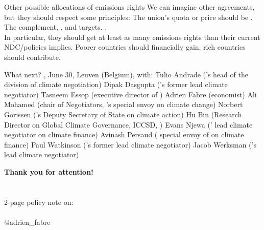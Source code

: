 \documentclass[aspectratio=169,xcolor=dvipsnames, 11pt,mathserif]{beamer}
\begin{document}
\begin{framefont}{\small}
\begin{frame}{Other possible allocations of emissions rights}
    \bbsp \ip We can imagine other agreements, but they should respect some principles:
    \ip The union's quota or price should be . 
    \ip The  complement, ,  and targets.
    \ip {}. \\ In particular, they should get at least as many emissions rights than their current NDC/policies implies.
    \ip Poorer countries should financially gain, rich countries should contribute.
    \ee
\end{frame}

\begin{frame}{What next?}
    \bbvs \ip {}, June 30, Leuven (Belgium), with:
    \bbvs \ip Tulio Andrade ('s head of the division of climate negotiation)
    \ip Dipak Dasgupta ('s former lead climate negotiator)
    \ip Tasneem Essop (executive director of )
    \ip Adrien Fabre (economist)
    \ip Ali Mohamed (chair of  Negotiators, 's special envoy on climate change)
    \ip Norbert Gorissen ('s Deputy Secretary of State on climate action)
    \ip Hu Bin (Research Director on Global Climate Governance, ICCSD, )
    \ip Evans Njewa (' lead climate negotiator on climate finance)
    \ip Avinash Persaud ( special envoy of on climate finance)
    \ip Paul Watkinson ('s former lead climate negotiator)
    \ip Jacob Werksman ('s lead climate negotiator) 
    \ee \ee
\end{frame}

\begin{frame}{}
\centering \Large \textbf{Thank you for attention!}
\\ \quad \\ \quad \\ 2-page policy note on: 
\\ \quad \\ @adrien\_fabre 
\end{frame}


\end{framefont}
\end{document}
